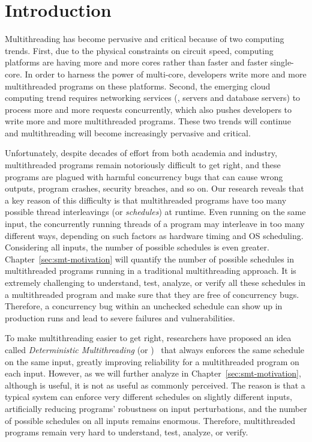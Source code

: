 \chapter{Introduction} \label{sec:intro}

Multithreading has become pervasive and critical because of two computing
trends. First, due to the physical constraints on circuit speed, computing
platforms are having more and more cores rather than faster and faster
single-core. In order to harness the power of multi-core, developers write more
and more multithreaded programs on these platforms. Second, the emerging cloud
computing trend requires networking services (\eg, \http servers and database
servers) to process more and more requests concurrently, which also pushes
developers to write more and more multithreaded programs. These two trends will
continue and multithreading will become increasingly pervasive and critical.

Unfortunately, despite decades of effort from both academia and industry,
multithreaded programs remain notoriously difficult to get right, and these
programs are plagued with harmful concurrency bugs that can cause wrong outputs,
program crashes, security breaches, and so on. Our research reveals that a key
reason of this difficulty is that multithreaded programs have too many
possible thread interleavings (or \emph{schedules}) at runtime. Even running on 
the same input, the concurrently running threads of a program may interleave in 
too many different ways, depending on such factors as hardware timing and OS
scheduling. Considering all inputs, the number of possible schedules is even
greater. Chapter~\ref{sec:smt-motivation} will quantify the number of
possible schedules in multithreaded programs running in a traditional
multithreading approach. It is extremely challenging to understand, test, 
analyze, or verify all these schedules in a multithreaded program and 
make sure that they are free of concurrency bugs. Therefore, a concurrency bug 
within an unchecked schedule can show up in production runs and lead to severe 
failures and vulnerabilities.

To make multithreading easier to get right, researchers have proposed an idea 
called \emph{Deterministic Multithreading} (or 
\emph{\dmt})~\cite{dthreads:sosp11, dpj:oopsla09, dmp:asplos09, kendo:asplos09, 
coredet:asplos10} that always enforces the same schedule on the same input, 
greatly improving reliability for a multithreaded program on each input. 
However, as we will further analyze in
Chapter~\ref{sec:smt-motivation}, although \dmt is useful, it is not as useful
as commonly perceived. The reason is that a typical \dmt system can enforce
very different schedules on slightly different inputs, artificially reducing
programs' robustness on input perturbations, and the number of possible
schedules on all inputs remains enormous. Therefore, multithreaded programs
remain very hard to understand, test, analyze, or verify.

